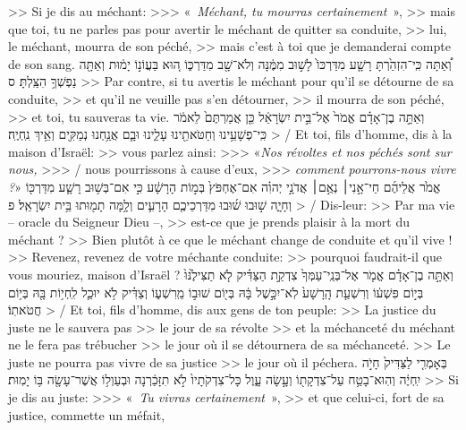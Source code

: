 \begin{paracol}[1]
  {>> Si je dis au méchant:
    >>> «~\textit{Méchant, tu mourras certainement}~»,
    >> mais que toi, tu ne parles pas pour avertir le méchant de quitter sa conduite,
    >> lui, le méchant, mourra de son péché,
    >> mais c’est à toi que je demanderai compte de son sang.}
  \verset
  {וְ֠אַתָּה כִּֽי־הִזְהַ֙רְתָּ רָשָׁ֤ע מִדַּרְכּוֹ֙ לָשׁ֣וּב מִמֶּ֔נָּה
    וְלֹא־שָׁ֖ב מִדַּרְכּ֑וֹ
    ה֚וּא בַּעֲוֹנ֣וֹ יָמ֔וּת
    וְאַתָּ֖ה נַפְשְׁךָ֥ הִצַּֽלְתָּ׃ ס}
  {>> Par contre, si tu avertis le méchant pour qu’il se détourne de sa conduite,
    >> et qu’il ne veuille pas s’en détourner,
    >> il mourra de son péché,
    >> et toi, tu sauveras ta vie.}
  \parSpace
  \verset
  {וְאַתָּ֣ה בֶן־אָדָ֗ם אֱמֹר֙ אֶל־בֵּ֣ית יִשְׂרָאֵ֔ל
    כֵּ֤ן אֲמַרְתֶּם֙ לֵאמֹ֔ר
    כִּֽי־פְשָׁעֵ֥ינוּ וְחַטֹּאתֵ֖ינוּ עָלֵ֑ינוּ
    וּבָ֛ם אֲנַ֥חְנוּ נְמַקִּ֖ים
    וְאֵ֥יךְ נִֽחְיֶֽה׃}
  {> / Et toi, fils d’homme, dis à la maison d’Israël:
    >> vous parlez ainsi:
    >>> «\textit{Nos révoltes et nos péchés sont sur nous,}
    >>> / nous pourrissons à cause d’eux,
    >>> \textit{comment pourrons-nous vivre ?}»}
  \verset
  {אֱמֹ֙ר אֲלֵיהֶ֜ם
    חַי־אָ֣נִי׀ נְאֻ֣ם׀ אֲדֹנָ֣י יְהוִ֗ה
    אִם־אֶחְפֹּץ֙ בְּמ֣וֹת הָרָשָׁ֔ע
    כִּ֣י אִם־בְּשׁ֥וּב רָשָׁ֛ע מִדַּרְכּ֖וֹ וְחָיָ֑ה
    שׁ֣וּבוּ שׁ֜וּבוּ מִדַּרְכֵיכֶ֧ם הָרָעִ֛ים
    וְלָ֥מָּה תָמ֖וּתוּ בֵּ֥ית יִשְׂרָאֵֽל׃ פ}
  {> / Dis-leur:
    >> Par ma vie – oracle du Seigneur Dieu –,
    >> est-ce que je prends plaisir à la mort du méchant ?
    >> Bien plutôt à ce que le méchant change de conduite et qu’il vive !
    >> Revenez, revenez de votre méchante conduite:
    >> pourquoi faudrait-il que vous mouriez, maison d’Israël ?}
  \clearpage
  \verset
  {וְאַתָּ֣ה בֶן־אָדָ֗ם אֱמֹ֤ר אֶל־בְּנֵֽי־עַמְּךָ֙
    צִדְקַ֣ת הַצַּדִּ֗יק לֹ֤א תַצִּילֶ֙נּוּ֙
    בְּי֣וֹם פִּשְׁע֔וֹ
    וְרִשְׁעַ֤ת הָֽרָשָׁע֙ לֹֽא־יִכָּ֣שֶׁל בָּ֔הּ
    בְּי֖וֹם שׁוּב֣וֹ מֵֽרִשְׁע֑וֹ
    וְצַדִּ֗יק לֹ֥א יוּכַ֛ל לִֽחְי֥וֹת בָּ֖הּ
    בְּי֥וֹם חֲטֹאתֽוֹ׃}
  {> / Et toi, fils d’homme, dis aux gens de ton peuple:
    >> La justice du juste ne le sauvera pas
    >> le jour de sa révolte
    >> et la méchanceté du méchant ne le fera pas trébucher
    >> le jour où il se détournera de sa méchanceté.
    >> Le juste ne pourra pas vivre de sa justice
    >> le jour où il péchera.}
  \verseSpace
  \verset
  {בְּאָמְרִ֤י לַצַּדִּיק֙
    חָיֹ֣ה יִֽחְיֶ֔ה
    וְהֽוּא־בָטַ֥ח עַל־צִדְקָת֖וֹ וְעָ֣שָׂה עָ֑וֶל
    כָּל־צִדְקֹתָיו֙ לֹ֣א תִזָּכַ֔רְנָה
    וּבְעַוְל֥וֹ אֲשֶׁר־עָשָׂ֖ה בּ֥וֹ יָמֽוּת׃}
  {>> Si je dis au juste:
    >>> «~\textit{Tu vivras certainement}~»,
    >> et que celui-ci, fort de sa justice, commette un méfait,
}
\end{paracol}
